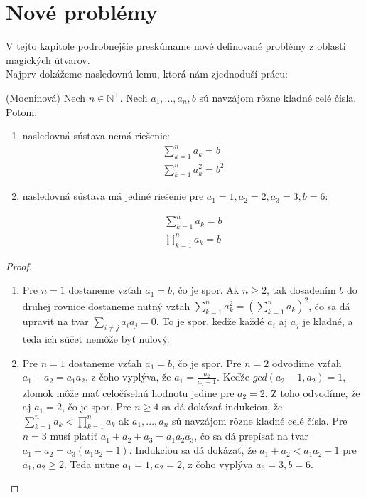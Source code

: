 \chapter{Nové problémy}

\label{kap:newproblems} %

V tejto kapitole podrobnejšie preskúmame nové definované problémy z oblasti magických útvarov. \\

Najprv dokážeme nasledovnú lemu, ktorá nám zjednoduší prácu:

\begin{lemma} (Mocninová) Nech $n \in \mathbb{N^+}$. Nech $a_1, ... , a_n , b$ sú navzájom rôzne kladné celé čísla. Potom:

\begin{enumerate}
\item nasledovná sústava nemá riešenie:
\begin{gather}
\sum_{k=1}^{n} a_k = b \\
\sum_{k=1}^{n} a^2_k = b^2
\end{gather}

\item nasledovná sústava má jediné riešenie pre $a_1 = 1, a_2 = 2, a_3 = 3, b = 6$:

\begin{gather}
\sum_{k=1}^{n} a_k = b \\
\prod_{k=1}^{n} a_k = b
\end{gather}
\end{enumerate}

\end{lemma}

\begin{proof}
\begin{enumerate}
\item Pre $n = 1$ dostaneme vzťah $a_1 = b$, čo je spor. Ak $n \geq 2$, tak dosadením $b$ do druhej rovnice dostaneme nutný vzťah $\sum_{k=1}^{n} a^2_k = (\sum_{k=1}^{n} a_k)^2$, čo sa dá upraviť na tvar $\sum_{i \neq j} a_i a_j = 0$. To je spor, keďže každé $a_i$ aj $a_j$ je kladné, a teda ich súčet nemôže byť nulový. \\

\item Pre $n = 1$ dostaneme vzťah $a_1 = b$, čo je spor. Pre $n = 2$ odvodíme vzťah $a_1 + a_2 = a_1 a_2$, z čoho vyplýva, že $a_1 = \frac{a_2}{a_2 - 1}$. Keďže $gcd(a_2 - 1, a_2) = 1$, zlomok môže mať celočíselnú hodnotu jedine pre $a_2 = 2$. Z toho odvodíme, že aj $a_1 = 2$, čo je spor. Pre $n \geq 4$ sa dá dokázať indukciou, že $\sum_{k=1}^{n} a_k < \prod_{k=1}^{n} a_k$ ak $a_1, ... , a_n$ sú navzájom rôzne kladné celé čísla. Pre $n = 3$ musí platiť $a_1 + a_2 + a_3 = a_1 a_2 a_3$, čo sa dá prepísať na tvar $a_1 + a_2 = a_3 (a_1 a_2 - 1)$. Indukciou sa dá dokázať, že $a_1 + a_2 < a_1 a_2 - 1$ pre $a_1, a_2 \geq 2$. Teda nutne $a_1 = 1, a_2 = 2$, z čoho vyplýva $a_3 = 3, b = 6$.
\end{enumerate}
\end{proof}



